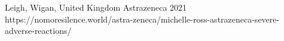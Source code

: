           {Leigh, Wigan, United Kingdom}
          {}
          {Astrazeneca}
          {2021}
          {
          }
          {https://nomoresilence.world/astra-zeneca/michelle-ross-astrazeneca-severe-adverse-reactions/}


